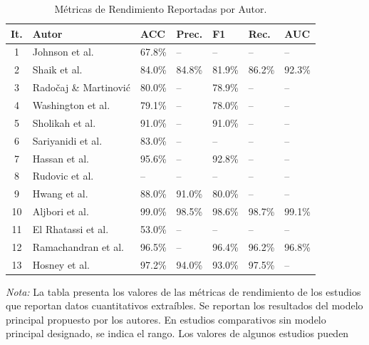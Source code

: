 \documentclass[3p,twocolumn,times]{elsarticle}
\begin{document}
	\begin{table}[t]
		\centering
		\caption{Métricas de Rendimiento Reportadas por Autor.}\label{tab9}
		\begin{tabular}{cllllll}
			\toprule
			\textbf{It.} & \textbf{Autor} & \textbf{ACC} & \textbf{Prec.} & \textbf{F1} &
			\textbf{Rec.} & \textbf{AUC} \\
			\midrule
			1  & Johnson et al.\ \cite{Johnson2025}       & 67.8\% & --     & --     & --     & -- \\
			2  & Shaik et al.\ \cite{Shaik2025}           & 84.0\% & 84.8\% & 81.9\% & 86.2\% & 92.3\% \\
			3  & Radočaj \& Martinović \cite{Radocaj2025} & 80.0\% & --     & 78.9\% & --     & -- \\
			4  & Washington et al.\ \cite{Washington2022} & 79.1\% & --     & 78.0\% & --     & -- \\
			5  & Sholikah et al.\ \cite{Sholikah2024}     & 91.0\% & --     & 91.0\% & --     & -- \\
			6  & Sariyanidi et al.\ \cite{Sariyanidi2025} & 83.0\% & --     & --     & --     & -- \\
			7  & Hassan et al.\ \cite{Hassan2025}         & 95.6\% & --     & 92.8\% & --     & -- \\
			8  & Rudovic et al.\ \cite{Rudovic2019}       & --     & --     & --     & --     & -- \\
			9  & Hwang et al.\ \cite{Hwang2024}           & 88.0\% & 91.0\% & 80.0\% & --     & -- \\
			10 & Aljbori et al.\ \cite{Aljbori2025}       & 99.0\% & 98.5\% & 98.6\% & 98.7\% & 99.1\% \\
			11 & El Rhatassi et al.\ \cite{Rhatassi2025}  & 53.0\% & --     & --     & --     & -- \\
			12 & Ramachandran et al.\ \cite{Ramachandran2025} & 96.5\% & -- & 96.4\% & 96.2\% & 96.8\% \\
			13 & Hosney et al.\ \cite{Hosney2024}         & 97.2\% & 94.0\% & 93.0\% & 97.5\% & -- \\
			\bottomrule
		\end{tabular}
		\begin{minipage}{\textwidth}
			\vspace{6pt}
			\small\textit{Nota:} La tabla presenta los valores de las métricas de rendimiento de
			los estudios que reportan datos cuantitativos extraíbles. Se reportan los resultados
			del modelo principal propuesto por los autores. En estudios comparativos sin modelo
			principal designado, se indica el rango. Los valores de algunos estudios pueden

\end{minipage}
\end{table}
\end{document}
